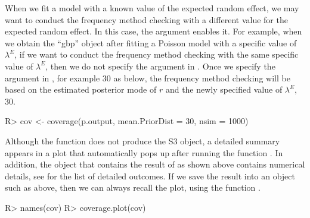 \documentclass[article]{jss}
\begin{document}
When we fit a model with a known value of the expected random effect, we may want to conduct the frequency method checking with a different value for the expected random effect. In this case, the argument  enables it. For example, when we obtain the ``gbp'' object    after fitting a Poisson model with a specific value of  $\lambda^E$, if we want to conduct the frequency method checking with the same specific value of  $\lambda^E$, then we do not specify the argument  in . Once we specify the argument  in , for example 30 as below, the frequency method checking will be based on the estimated posterior mode of $r$ and the newly specified value of $\lambda^E$, 30.
\begin{CodeChunk}
\begin{CodeInput}
R> cov <- coverage(p.output, mean.PriorDist = 30, nsim = 1000)
\end{CodeInput}
\end{CodeChunk}

Although the function  does not produce the S3 object, a detailed summary appears in a plot that automatically pops up after running the function . In addition, the object  that contains the result of  as shown above contains numerical details, see  for the list of detailed outcomes. If we save the result into an object such as  above, then we can always recall the plot, using the function .
\begin{CodeChunk}
\begin{CodeInput}
R> names(cov)
R> coverage.plot(cov)
\end{CodeInput}
\end{CodeChunk}



\end{document}
